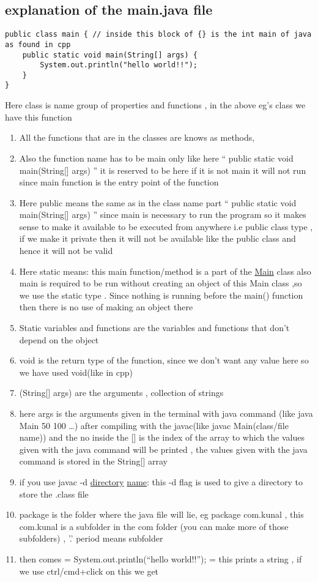 \documentclass[11pt]{article}
\begin{document}
\subsection{explanation of the main.java file}
\label{sec:org8962d53}

\begin{verbatim}
public class main { // inside this block of {} is the int main of java as found in cpp
    public static void main(String[] args) {
        System.out.println("hello world!!");
    }
}
\end{verbatim}
Here class is name group of properties and functions , in the above eg's class we have this function

\begin{enumerate}
\item All the functions that are in the classes are knows as methods,
\item Also the function name has to be main only like here `` public static void main(String[] args) '' it is reserved to be here if it is not main it will not run since main function is the entry point of the function
\item Here public means the same as in the class name part `` public static void main(String[] args) '' since main is necessary to run the program so it makes sense to make it available to be executed from anywhere i.e public class type , if we make it private then it will not be available like the public class and hence it will not be valid
\item Here static means: this main function/method is a part of the \uline{Main} class also main is required to be run without creating an object of this Main class ,so we use the static type . Since nothing is running before the main() function then there is no use of making an object there
\item Static variables and functions are the variables and functions that don't depend on the object
\item void is the return type of the function, since we don't want any value here so we have used void(like in cpp)
\item (String[] args) are the arguments , collection of strings
\item here args is the arguments given in the terminal with java command (like java Main 50 100 \ldots{}) after compiling with the javac(like javac Main(class/file name)) and the no inside the [] is the index of the array to which the values given with the java command will be printed , the values given with the java command is stored in the String[] array
\item if you use javac -d \uline{directory} \uline{name}: this -d flag is used to give a directory to store the .class file
\item package is the folder where the java file will lie, eg package com.kunal , this com.kunal is a subfolder in the com folder (you can make more of those subfolders) , '.' period means subfolder
\item then comes = System.out.println(``hello world!!''); = this prints a string , if we use ctrl/cmd+click on this we get
\end{enumerate}
\end{document}

